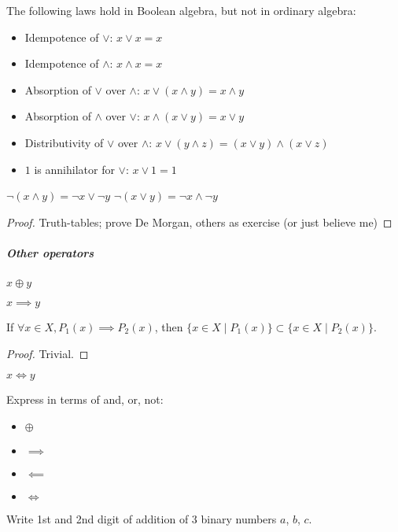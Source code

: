 \begin{property}
	The following laws hold in Boolean algebra, but not in ordinary algebra: 
	\begin{itemize}
		\item Idempotence of $\lor$: $x \lor x = x$
		\item Idempotence of $\land$: $x \land x = x$
		\item Absorption of $\lor$ over $\land$: $x \lor (x \land y)  = x \land y$
		\item Absorption of $\land$ over $\lor$: $x \land (x \lor y)  = x \lor y$
		\item Distributivity of $\lor$ over $\land$:  $x \lor (y \land z) = (x \lor y) \land (x \lor z)$
		\item $1$ is annihilator for $\lor$: $x \lor 1 = 1$
	\end{itemize}
\end{property}
\begin{property}
	$\lnot (x \land y) = \lnot x \lor \lnot y$
	$\lnot (x \lor y) = \lnot x \land \lnot y$
\end{property}
\begin{proof}
	Truth-tables; prove De Morgan, others as exercise (or just believe me)
\end{proof}

\subparagraph{Other operators}
\begin{definition}[Exclusive Or]
	$x \oplus y$
\end{definition}
\begin{definition}[Implication]
	$x \implies y$
\end{definition}
\begin{property}
	If $\forall x \in X, P_1(x) \implies P_2(x)$, then $\{ x \in X \mid P_1(x) \} \subset \{ x \in X \mid P_2(x) \}$.
\end{property}
\begin{proof}
	Trivial.
\end{proof}
\begin{definition}
	$x \iff y$
\end{definition}
\begin{question}
	Express in terms of and, or, not:
	\begin{itemize}
		\item $\oplus$
		\item $\implies$
		\item $\impliedby$
		\item $\iff$
	\end{itemize}
	Write 1st and 2nd digit of addition of 3 binary numbers $a$, $b$, $c$.
\end{question}

